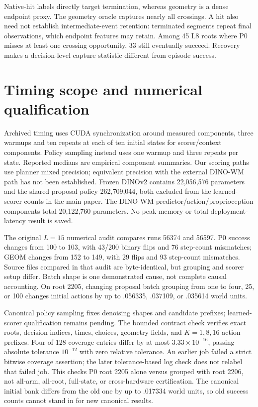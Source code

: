 \documentclass[10pt,twocolumn,letterpaper]{article}
\begin{document}
Native-hit labels directly target termination, whereas geometry is a dense endpoint proxy. The geometry oracle captures nearly all crossings. A hit also need not establish intermediate-event retention: terminated segments repeat final observations, which endpoint features may retain. Among 45 L8 roots where P0 misses at least one crossing opportunity, 33 still eventually succeed. Recovery makes a decision-level capture statistic different from episode success.

\section{Timing scope and numerical qualification}
Archived timing uses CUDA synchronization around measured components, three warmups and ten repeats at each of ten initial states for scorer/context components. Policy sampling instead uses one warmup and three repeats per state. Reported medians are empirical component summaries. Our scoring paths use planner mixed precision; equivalent precision with the external DINO-WM path has not been established. Frozen DINOv2 contains 22,056,576 parameters and the shared proposal policy 262,709,044, both excluded from the learned-scorer counts in the main paper. The DINO-WM predictor/action/proprioception components total 20,122,760 parameters. No peak-memory or total deployment-latency result is saved.

The original $L=15$ numerical audit compares runs 56374 and 56597. P0 success changes from 100 to 103, with 43/200 binary flips and 76 step-count mismatches; GEOM changes from 152 to 149, with 29 flips and 93 step-count mismatches. Source files compared in that audit are byte-identical, but grouping and scorer setup differ. Batch shape is one demonstrated cause, not complete causal accounting. On root 2205, changing proposal batch grouping from one to four, 25, or 100 changes initial actions by up to .056335, .037109, or .035614 world units.

Canonical policy sampling fixes denoising shapes and candidate prefixes; learned-scorer qualification remains pending. The bounded contract check verifies exact roots, decision indices, times, choices, geometry fields, and $K=1,8,16$ action prefixes. Four of 128 coverage entries differ by at most $3.33\times10^{-16}$, passing absolute tolerance $10^{-12}$ with zero relative tolerance. An earlier job failed a strict bitwise coverage assertion; the later tolerance-based log check does not relabel that failed job. This checks P0 root 2205 alone versus grouped with root 2206, not all-arm, all-root, full-state, or cross-hardware certification. The canonical initial bank differs from the old one by up to .017334 world units, so old success counts cannot stand in for new canonical results.
\end{document}
